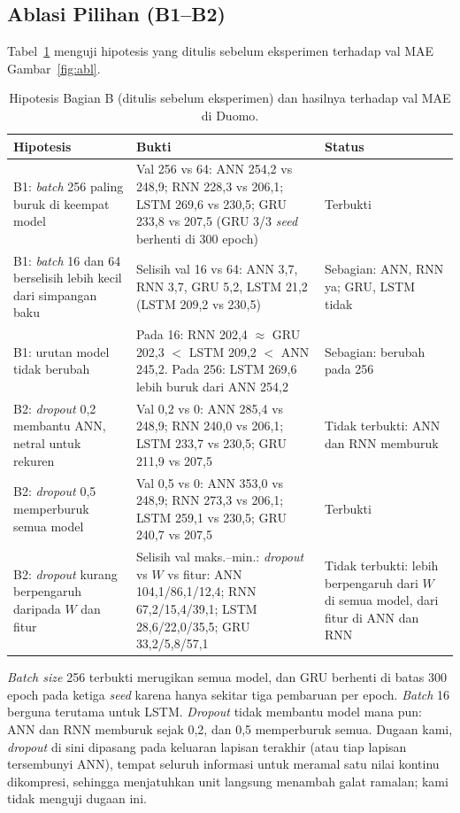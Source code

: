 \documentclass[conference,a4paper]{IEEEtran}
\begin{document}
\subsection{Ablasi Pilihan (B1--B2)}
Tabel~\ref{tab:hip} menguji hipotesis yang ditulis sebelum eksperimen terhadap val MAE Gambar~\ref{fig:abl}.

\begin{table}[t]
  \centering
  \caption{Hipotesis Bagian B (ditulis sebelum eksperimen) dan hasilnya terhadap val MAE di Duomo.}
  \label{tab:hip}
  \footnotesize
  \renewcommand{\arraystretch}{1.15}
  \begin{tabular}{@{}p{}p{}p{}@{}}
    \toprule
    Hipotesis & Bukti & Status \\
    \midrule
    B1: \textit{batch} 256 paling buruk di keempat model & Val 256 vs 64: ANN 254,2 vs 248,9; RNN 228,3 vs 206,1; LSTM 269,6 vs 230,5; GRU 233,8 vs 207,5 (GRU 3/3 \textit{seed} berhenti di 300 epoch) & Terbukti \\
    B1: \textit{batch} 16 dan 64 berselisih lebih kecil dari simpangan baku & Selisih val 16 vs 64: ANN 3,7, RNN 3,7, GRU 5,2, LSTM 21,2 (LSTM 209,2 vs 230,5) & Sebagian: ANN, RNN ya; GRU, LSTM tidak \\
    B1: urutan model tidak berubah & Pada 16: RNN 202,4 $\approx$ GRU 202,3 $<$ LSTM 209,2 $<$ ANN 245,2. Pada 256: LSTM 269,6 lebih buruk dari ANN 254,2 & Sebagian: berubah pada 256 \\
    B2: \textit{dropout} 0,2 membantu ANN, netral untuk rekuren & Val 0,2 vs 0: ANN 285,4 vs 248,9; RNN 240,0 vs 206,1; LSTM 233,7 vs 230,5; GRU 211,9 vs 207,5 & Tidak terbukti: ANN dan RNN memburuk \\
    B2: \textit{dropout} 0,5 memperburuk semua model & Val 0,5 vs 0: ANN 353,0 vs 248,9; RNN 273,3 vs 206,1; LSTM 259,1 vs 230,5; GRU 240,7 vs 207,5 & Terbukti \\
    B2: \textit{dropout} kurang berpengaruh daripada $W$ dan fitur & Selisih val maks.--min.: \textit{dropout} vs $W$ vs fitur: ANN 104,1/86,1/12,4; RNN 67,2/15,4/39,1; LSTM 28,6/22,0/35,5; GRU 33,2/5,8/57,1 & Tidak terbukti: lebih berpengaruh dari $W$ di semua model, dari fitur di ANN dan RNN \\
    \bottomrule
  \end{tabular}
\end{table}

\textit{Batch size} 256 terbukti merugikan semua model, dan GRU berhenti di batas 300 epoch pada ketiga \textit{seed} karena hanya sekitar tiga pembaruan per epoch. \textit{Batch} 16 berguna terutama untuk LSTM. \textit{Dropout} tidak membantu model mana pun: ANN dan RNN memburuk sejak 0,2, dan 0,5 memperburuk semua. Dugaan kami, \textit{dropout} di sini dipasang pada keluaran lapisan terakhir (atau tiap lapisan tersembunyi ANN), tempat seluruh informasi untuk meramal satu nilai kontinu dikompresi, sehingga menjatuhkan unit langsung menambah galat ramalan; kami tidak menguji dugaan ini.
\end{document}
